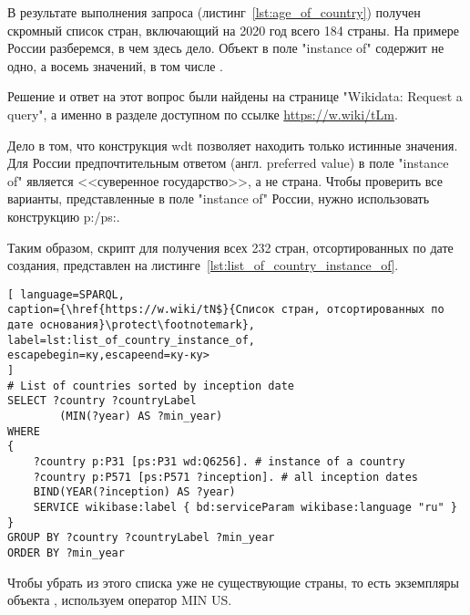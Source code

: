 
В результате выполнения запроса (листинг~\ref{lst:age_of_country}) получен скромный список стран, включающий на 2020 год всего 184 страны. На примере России разберемся, в чем здесь дело. Объект  в поле "instance of" содержит не одно, а восемь значений, в том числе .


Решение и ответ на этот вопрос были найдены на странице "Wikidata: Request a query", а именно в разделе доступном по ссылке \href{https://w.wiki/tLm}{https://w.wiki/tLm}.

Дело в том, что конструкция wdt позволяет находить только истинные значения. Для России предпочтительным ответом (англ. preferred value) в поле "instance of" является <<суверенное государство>>, а не страна. Чтобы проверить все варианты, представленные в поле "instance of" России, нужно использовать конструкцию p:/ps:.

Таким образом, скрипт для получения всех 232 стран, отсортированных по дате создания, представлен на листинге~\ref{lst:list_of_country_instance_of}.

\begin{lstlisting}[ language=SPARQL, 
caption={\href{https://w.wiki/tN$}{Список стран, отсортированных по дате основания}\protect\footnotemark},
label=lst:list_of_country_instance_of, 
escapebegin=ку,escapeend=ку-ку>
]
# List of countries sorted by inception date
SELECT ?country ?countryLabel
		(MIN(?year) AS ?min_year)
WHERE
{
	?country p:P31 [ps:P31 wd:Q6256]. # instance of a country 
	?country p:P571 [ps:P571 ?inception]. # all inception dates
	BIND(YEAR(?inception) AS ?year)
	SERVICE wikibase:label { bd:serviceParam wikibase:language "ru" }
}
GROUP BY ?country ?countryLabel ?min_year
ORDER BY ?min_year
\end{lstlisting}


Чтобы убрать из этого списка уже не существующие страны, то есть экземпляры объекта , используем оператор MIN US.

